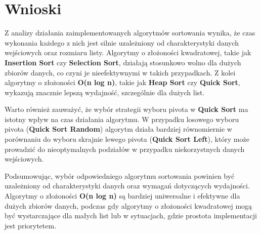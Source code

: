 \documentclass{article}
\begin{document}
	\section{Wnioski}
	
	Z analizy działania zaimplementowanych algorytmów sortowania wynika, że czas wykonania każdego z nich jest silnie uzależniony od charakterystyki danych wejściowych oraz rozmiaru listy. Algorytmy o złożoności kwadratowej, takie jak \textbf{Insertion Sort} czy \textbf{Selection Sort}, działają stosunkowo wolno dla dużych zbiorów danych, co czyni je nieefektywnymi w takich przypadkach. Z kolei algorytmy o złożoności \textbf{O(n log n)}, takie jak \textbf{Heap Sort} czy \textbf{Quick Sort}, wykazują znacznie lepszą wydajność, szczególnie dla dużych list.
	
	Warto również zauważyć, że wybór strategii wyboru pivota w \textbf{Quick Sort} ma istotny wpływ na czas działania algorytmu. W przypadku losowego wyboru pivota (\textbf{Quick Sort Random}) algorytm działa bardziej równomiernie w porównaniu do wyboru skrajnie lewego pivota (\textbf{Quick Sort Left}), który może prowadzić do nieoptymalnych podziałów w przypadku niekorzystnych danych wejściowych.
	
	Podsumowując, wybór odpowiedniego algorytmu sortowania powinien być uzależniony od charakterystyki danych oraz wymagań dotyczących wydajności. Algorytmy o złożoności \textbf{O(n log n)} są bardziej uniwersalne i efektywne dla dużych zbiorów danych, podczas gdy algorytmy o złożoności kwadratowej mogą być wystarczające dla małych list lub w sytuacjach, gdzie prostota implementacji jest priorytetem.
	
\end{document}
